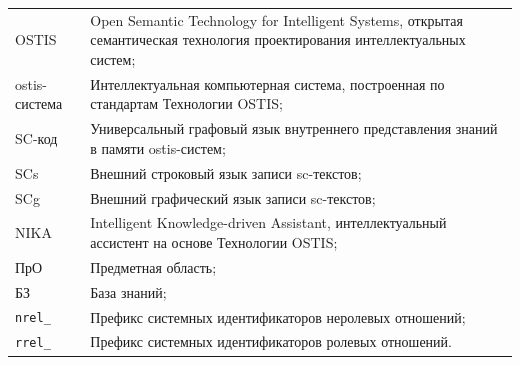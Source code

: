 \label{sec:reduction}

\noindent
\begin{tabular}{@{}p{2.8cm}@{\ \mdash\ }p{11.8cm}@{}}
OSTIS & Open Semantic Technology for Intelligent Systems, открытая семантическая технология проектирования интеллектуальных систем;\\
ostis-система & Интеллектуальная компьютерная система, построенная по стандартам Технологии OSTIS;\\
SC-код & Универсальный графовый язык внутреннего представления знаний в памяти ostis-систем;\\
SCs & Внешний строковый язык записи sc-текстов;\\
SCg & Внешний графический язык записи sc-текстов;\\
NIKA & Intelligent Knowledge-driven Assistant, интеллектуальный ассистент на основе Технологии OSTIS;\\
ПрО & Предметная область;\\
БЗ & База знаний;\\
\texttt{nrel\_} & Префикс системных идентификаторов неролевых отношений;\\
\texttt{rrel\_} & Префикс системных идентификаторов ролевых отношений.
\end{tabular}
